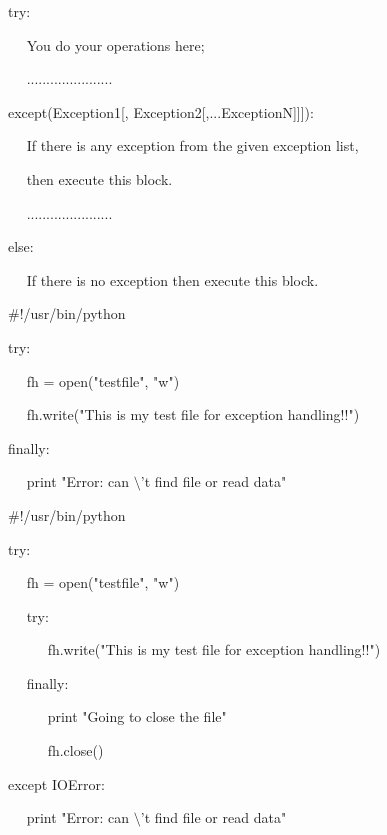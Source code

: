 \vspace{12pt}
\noindent 
try: \par
\noindent 
~~ You do your operations here; \par
\noindent 
~~ ...................... \par
\noindent 
except(Exception1[, Exception2[,...ExceptionN]]]): \par
\noindent 
~~ If there is any exception from the given exception list,  \par
\noindent 
~~ then execute this block. \par
\noindent 
~~ ...................... \par
\noindent 
else: \par
\noindent 
~~ If there is no exception then execute this block.  \par
\vspace{12pt}
\vspace{12pt}
\noindent 
 $  \#  $!/usr/bin/python \par
\vspace{12pt}
\noindent 
try: \par
\noindent 
~~ fh = open("testfile", "w") \par
\noindent 
~~ fh.write("This is my test file for exception handling!!") \par
\noindent 
finally: \par
\noindent 
~~ print "Error: can $  \setminus  $'t find file or read data" \par
\vspace{12pt}
\vspace{12pt}
\noindent 
 $  \#  $!/usr/bin/python \par
\vspace{12pt}
\noindent 
try: \par
\noindent 
~~ fh = open("testfile", "w") \par
\noindent 
~~ try: \par
\noindent 
~~~~~ fh.write("This is my test file for exception handling!!") \par
\noindent 
~~ finally: \par
\noindent 
~~~~~ print "Going to close the file" \par
\noindent 
~~~~~ fh.close() \par
\noindent 
except IOError: \par
\noindent 
~~ print "Error: can $  \setminus  $'t find file or read data" \par
\vspace{12pt}
\vspace{16pt}
